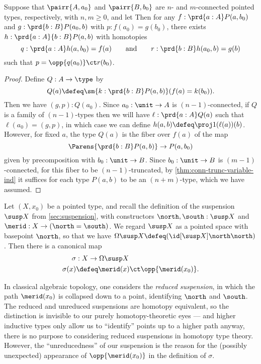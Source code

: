 \begin{lem}\label{thm:wedge-connectivity}
  Suppose that $\pairr{A,a_0}$ and $\pairr{B,b_0}$ are $n$- and $m$-connected pointed types, respectively, with $n,m\geq0$, and let
%
%
Then for any ${f:\prd{a:A} P(a,b_0)}$ and ${g:\prd{b:B} P(a_0,b)}$ with $p:f(a_0) = g(b_0)$, there exists $h:\prd{a:A}{b:B} P(a,b)$ with homotopies
%
\begin{equation*}
  q:\prd{a:A} h(a,b_0)=f(a)
  \qquad\text{and}\qquad
  r:\prd{b:B} h(a_0,b)=g(b)
 \end{equation*}
%
such that $p = \opp{q(a_0)} \ct r(b_0)$.
\end{lem}
\begin{proof}
  Define $Q:A\to\type$ by
  \[ Q(a) \defeq \sm{k:\prd{b:B} P(a,b)} (f(a) = k(b_0)). \]
  Then we have $(g,p):Q(a_0)$.
  Since $a_0:\unit\to A$ is $(n-1)$-connected, if $Q$ is a family of $(n-1)$-types then we will have $\ell:\prd{a:A} Q(a)$ such that $\ell(a_0) = (g,p)$, in which case we can define $h(a,b) \defeq \proj1(\ell(a))(b)$.
  However, for fixed $a$, the type $Q(a)$ is the fiber over $f(a)$ of the map
  \[ \Parens{\prd{b:B} P(a,b) } \to P(a,b_0) \]
  given by precomposition with $b_0:\unit\to B$.
  Since $b_0:\unit\to B$ is $(m-1)$-connected, for this fiber to be $(n-1)$-truncated, by \cref{thm:conn-trunc-variable-ind} it suffices for each type $P(a,b)$ to be an $(n+m)$-type, which we have assumed.
\end{proof}

Let $(X,x_0)$ be a pointed type, and recall the definition of the suspension $\susp X$ from \cref{sec:suspension}, with constructors $\north,\south:\susp X$ and $\merid:X \to (\north=\south)$.
We regard $\susp X$ as a pointed space with basepoint $\north$, so that we have $\Omega\susp X \defeq (\id[\susp X]\north\north)$.
Then there is a canonical map
\begin{align*}
  \sigma &: X \to \Omega\susp X\\
  \sigma(x) &\defeq \merid(x) \ct \opp{\merid(x_0)}.
\end{align*}

\begin{rmk}
  In classical algebraic topology, one considers the \emph{reduced suspension}, in which the path $\merid(x_0)$ is collapsed down to a point, identifying $\north$ and $\south$.
  The reduced and unreduced suspensions are homotopy equivalent, so the distinction is invisible to our purely homotopy-theoretic eyes --- and higher inductive types only allow us to ``identify'' points up to a higher path anyway, there is no purpose to considering reduced suspensions in homotopy type theory.
  However, the ``unreducedness'' of our suspension is the reason for the (possibly unexpected) appearance of $\opp{\merid(x_0)}$ in the definition of $\sigma$.
\end{rmk}


